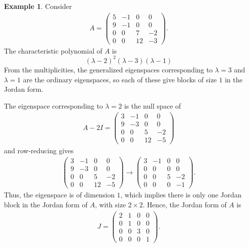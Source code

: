 \documentclass[11pt]{book}
\theoremstyle{definition}
\newtheorem{example}{Example}[section]
\numberwithin{equation}{subsection}
\begin{document}
\medskip

\begin{example}
Consider 
\begin{align*}
    A = \begin{pmatrix}
    5 & -1 & 0 & 0 \\
    9 & -1 & 0 & 0 \\
    0 & 0 & 7 & -2 \\
    0 & 0 & 12 & -3
    \end{pmatrix}.
\end{align*}
The characteristic polynomial of $A$ is 
$$(\lambda - 2)^2(\lambda - 3)(\lambda - 1)$$
From the multiplicities, the generalized eigenspaces corresponding to $\lambda = 3$ and $\lambda = 1$ are the ordinary eigenspaces, so each of these give blocks of size $1$ in the Jordan form.

The eigenspace corresponding to $\lambda = 2$ is the null space of 
\begin{align*}
    A - 2I = \begin{pmatrix}
    3 & -1 & 0 & 0 \\
    9 & -3 & 0 & 0 \\
    0 & 0 & 5 & -2 \\
    0 & 0 & 12 & -5
    \end{pmatrix}
\end{align*}
and row-reducing gives
\begin{align*}
    \begin{pmatrix}
    3 & -1 & 0 & 0 \\
    9 & -3 & 0 & 0 \\
    0 & 0 & 5 & -2 \\
    0 & 0 & 12 & -5
    \end{pmatrix} \to
    \begin{pmatrix}
    3 & -1 & 0 & 0 \\
    0 & 0 & 0 & 0 \\
    0 & 0 & 5 & -2 \\
    0 & 0 & 0 & -1
    \end{pmatrix}.
\end{align*}
Thus, the eigenspace is of dimension $1$, which implies there is only one Jordan block in the Jordan form of $A$, with size $2\times 2$. Hence, the Jordan form of $A$ is
\begin{align*}
    J = \begin{pmatrix}
    2 & 1 & 0 & 0 \\
    0 & 1 & 0 & 0 \\
    0 & 0 & 3 & 0 \\
    0 & 0 & 0 & 1
    \end{pmatrix}.
\end{align*}


\end{example}
\end{document}
